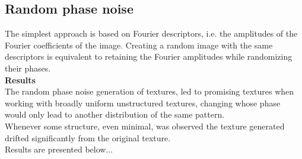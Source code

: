 \documentclass{article}
\begin{document}
    \subsection*{Random phase noise}
    The simplest approach is based on Fourier descriptors, i.e. the amplitudes of the Fourier coefficients of the image. Creating a random image with the same descriptors is equivalent to retaining the Fourier amplitudes while randomizing their phases.\\
\textbf{Results}\\
    The random phase noise generation of textures, led to promising textures when working with broadly uniform unstructured textures, changing whose phase would only lead to another distribution of the same pattern.\\
    Whenever some structure, even minimal, was observed the texture generated drifted significantly from the original texture.\\
    Results are presented below...\\
\end{document}
